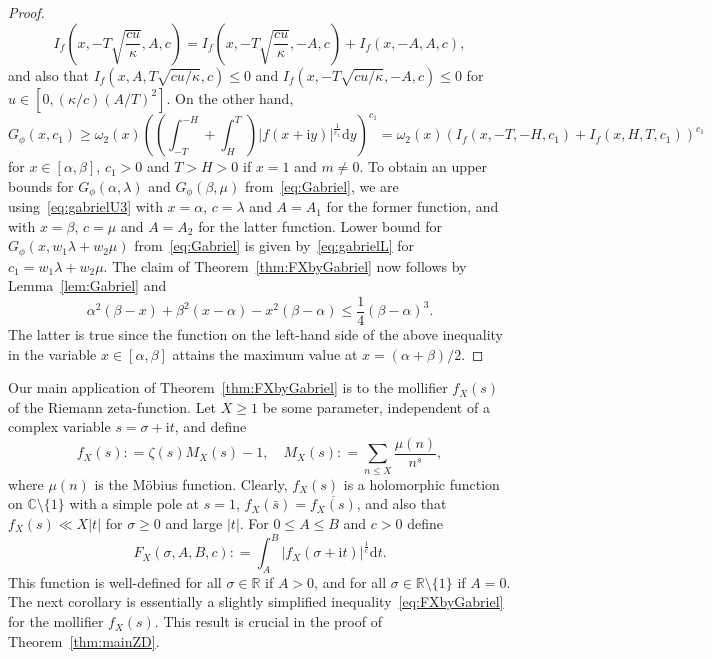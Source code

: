 \documentclass[a4paper,reqno]{amsart}
\theoremstyle{definition}
\newcommand{\R}{\mathbb{R}}
\newcommand{\C}{\mathbb{C}}
\newcommand{\de}[0]{\mathrel{\mathop:}=}
\newcommand{\ie}[0]{\mathrm{i}}
\newcommand{\dif}[1]{\mathrm{d}#1}
\begin{document}
\begin{proof}
\[
I_{f}\left(x,-T\sqrt{\frac{cu}{\kappa}},A,c\right) = I_{f}\left(x,-T\sqrt{\frac{cu}{\kappa}},-A,c\right) + I_{f}\left(x,-A,A,c\right), 
\]
and also that
$I_{f}(x,A,T\sqrt{cu/\kappa},c)\leq0$ and $I_{f}(x,-T\sqrt{cu/\kappa},-A,c)\leq0$ for $u\in[0,(\kappa/c)(A/T)^2]$. On the other hand, 
\begin{equation}
\label{eq:gabrielL}    
G_{\phi}(x,c_1) \geq  \omega_{2}(x)\left(\left(\int_{-T}^{-H}+\int_{H}^{T}\right)\left|f(x+\ie y)\right|^{\frac{1}{c_1}}\dif{y}\right)^{c_1} = \omega_{2}(x)\left(I_{f}(x,-T,-H,c_1)+I_{f}(x,H,T,c_1)\right)^{c_1}
\end{equation}
for $x\in[\alpha,\beta]$, $c_1>0$ and $T>H>0$ if $x=1$ and $m\neq 0$. To obtain an upper bounds for $G_{\phi}(\alpha,\lambda)$ and $G_{\phi}(\beta,\mu)$ from~\eqref{eq:Gabriel}, we are using~\eqref{eq:gabrielU3} with $x=\alpha$, $c=\lambda$ and $A=A_1$ for the former function, and with $x=\beta$, $c=\mu$ and $A=A_2$ for the latter function. Lower bound for $G_{\phi}(x,w_{1}\lambda+w_{2}\mu)$ from~\eqref{eq:Gabriel} is given by~\eqref{eq:gabrielL} for $c_1=w_{1}\lambda+w_{2}\mu$. The claim of Theorem~\ref{thm:FXbyGabriel} now follows by Lemma~\ref{lem:Gabriel} and
\[
\alpha^{2}(\beta-x) + \beta^{2}(x-\alpha) - x^{2}(\beta-\alpha) \leq \frac{1}{4}(\beta-\alpha)^{3}.
\]
The latter is true since the function on the left-hand side of the above inequality in the variable $x\in[\alpha,\beta]$ attains the maximum value at $x=(\alpha+\beta)/2$.
\end{proof}

Our main application of Theorem~\ref{thm:FXbyGabriel} is to the mollifier $f_{X}(s)$ of the Riemann zeta-function. Let $X\geq 1$ be some parameter, independent of a complex variable $s=\sigma+\ie t$, and define
\begin{equation}
\label{eq:fXMX}
f_{X}(s) \de \zeta(s) M_{X}(s)-1, \quad M_{X}(s)\de \sum_{n\leq X} \frac{\mu(n)}{n^{s}},
\end{equation}
where $\mu(n)$ is the M\"{o}bius function. Clearly, $f_X(s)$ is a holomorphic function on $\C\setminus\{1\}$ with a simple pole at $s=1$, $f_{X}(\bar{s})=\overline{f_X(s)}$, and also that $f_{X}(s)\ll X|t|$ for $\sigma\geq 0$ and large $|t|$. For $0\leq A\leq B$ and $c>0$ define 
\[
F_{X}(\sigma,A,B,c) \de \int_{A}^{B}\left|f_{X}(\sigma+\ie t)\right|^{\frac{1}{c}}\dif{t}.
\]
This function is well-defined for all $\sigma\in\R$ if $A>0$, and for all $\sigma\in\R\setminus\{1\}$ if $A=0$. The next corollary is essentially a slightly simplified inequality~\eqref{eq:FXbyGabriel} for the mollifier $f_{X}(s)$. This result is crucial in the proof of Theorem~\ref{thm:mainZD}.
\end{document}
